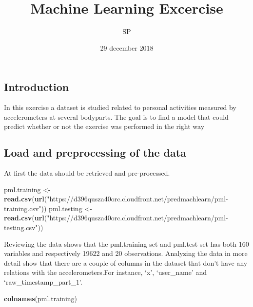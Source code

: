 \documentclass[]{article}
\title{Machine Learning Excercise}
\author{SP}
\date{29 december 2018}
\newenvironment{Shaded}{\begin{snugshade}}{\end{snugshade}}
\newcommand{\KeywordTok}[1]{\textcolor[rgb]{0.13,0.29,0.53}{\textbf{#1}}}
\newcommand{\StringTok}[1]{\textcolor[rgb]{0.31,0.60,0.02}{#1}}
\newcommand{\NormalTok}[1]{#1}
\begin{document}
\maketitle

\subsection{Introduction}\label{introduction}

In this exercise a dataset is studied related to personal activities
measured by accelerometers at several bodyparts. The goal is to find a
model that could predict whether or not the exercise was performed in
the right way

\subsection{Load and preprocessing of the
data}\label{load-and-preprocessing-of-the-data}

At first the data should be retrieved and pre-processed.

\begin{Shaded}
\begin{Highlighting}[]
\NormalTok{pml.training <-}\StringTok{ }\KeywordTok{read.csv}\NormalTok{(}\KeywordTok{url}\NormalTok{(}\StringTok{"https://d396qusza40orc.cloudfront.net/predmachlearn/pml-training.csv"}\NormalTok{))}
\NormalTok{pml.testing <-}\StringTok{ }\KeywordTok{read.csv}\NormalTok{(}\KeywordTok{url}\NormalTok{(}\StringTok{"https://d396qusza40orc.cloudfront.net/predmachlearn/pml-testing.csv"}\NormalTok{))}
\end{Highlighting}
\end{Shaded}

Reviewing the data shows that the pml.training set and pml.test set has
both 160 variables and respectively 19622 and 20 observations. Analyzing
the data in more detail show that there are a couple of columns in the
dataset that don't have any relations with the accelerometers.For
instance, `x', `user\_name' and `raw\_timestamp\_part\_1'.

\begin{Shaded}
\begin{Highlighting}[]
\KeywordTok{colnames}\NormalTok{(pml.training)}
\end{Highlighting}
\end{Shaded}
\end{document}
